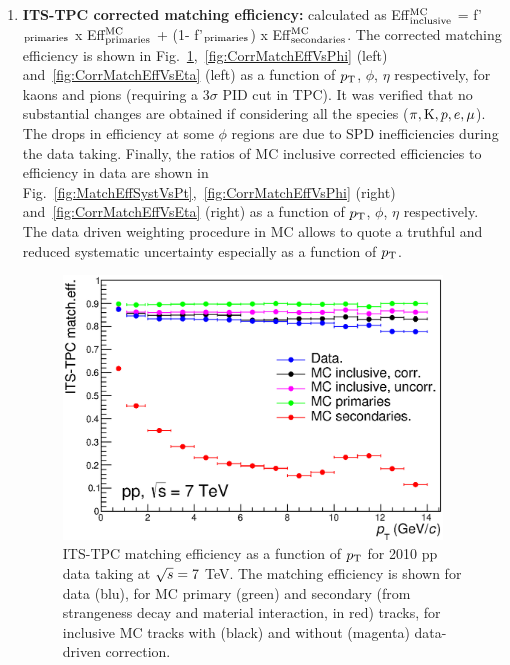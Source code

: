 \begin{enumerate}
\item {\bf ITS-TPC corrected matching efficiency:} calculated 
as  Eff$^{\rm MC}_{\rm inclusive}$ = f'$_{\rm primaries}$ x Eff$^{\rm MC}_{\rm primaries}$ + (1- f'$_{\rm primaries}$) x Eff$^{\rm MC}_{\rm secondaries}$. The corrected matching efficiency 
is shown in Fig.~\ref{fig:CorrMatchEffVsPt},~\ref{fig:CorrMatchEffVsPhi} 
(left) and~\ref{fig:CorrMatchEffVsEta} (left)
as a function of $p_{\rm T}$, $\phi$, $\eta$ respectively, for kaons and 
pions (requiring a 3$\sigma$ PID cut in TPC). 
It was verified that no substantial changes are obtained if 
considering all the species ($\pi, {\rm K}, p, e, \mu$). 
The drops in efficiency at some $\phi$ regions are due to SPD
inefficiencies during the data taking.
Finally, the ratios of MC inclusive corrected efficiencies to
efficiency in data are shown in Fig.~\ref{fig:MatchEffSystVsPt},~\ref{fig:CorrMatchEffVsPhi} 
(right) and~\ref{fig:CorrMatchEffVsEta} (right) as a function of 
$p_{\rm T}$, $\phi$, $\eta$ respectively. The data driven weighting procedure 
in MC allows to quote a truthful and reduced systematic uncertainty
especially as a function of $p_{\rm T}$. 
\begin{figure}[!htb]
\begin{center}
\includegraphics[height=7cm]{FigCap4/ITSTPCmatchEff_10bpass4_vsPt.eps}
\caption{ITS-TPC matching efficiency as a function of $p_{\rm T}$ for 2010 pp data taking at $\sqrt{s} = 7$ TeV. The matching efficiency is shown for data (blu), for MC primary (green) and secondary (from strangeness decay and material interaction, in red) tracks, for inclusive MC tracks with (black) and without (magenta) data-driven correction. }
\label{fig:CorrMatchEffVsPt}
\end{center}
\end{figure}
\begin{figure}[!htb]
\begin{center}

\end{center}
\end{figure}
\end{enumerate}
